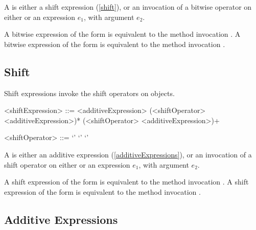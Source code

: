 \documentclass[makeidx]{article}
\begin{document}
\LMHash{}%
A  is either a shift expression (\ref{shift}),
or an invocation of a bitwise operator
on either \SUPER{} or an expression $e_1$,
with argument $e_2$.

\LMHash{}%
A bitwise expression of the form 
is equivalent to the method invocation .
A bitwise expression of the form 
is equivalent to the method invocation .



\subsection{Shift}

\LMHash{}%
Shift expressions invoke the shift operators on objects.

\begin{grammar}
<shiftExpression> ::= \gnewline{}
  <additiveExpression> (<shiftOperator> <additiveExpression>)*
  \alt \SUPER{} (<shiftOperator> <additiveExpression>)+

<shiftOperator> ::= `\ltlt'
  \alt `\gtgtgt'
  \alt `\gtgt'
\end{grammar}

\LMHash{}%
A  is either an additive expression
(\ref{additiveExpressions}),
or an invocation of a shift operator
on either \SUPER{} or an expression $e_1$,
with argument $e_2$.

\LMHash{}%
A shift expression of the form 
is equivalent to the method invocation .
A shift expression of the form 
is equivalent to the method invocation .



\subsection{Additive Expressions}
\end{document}
